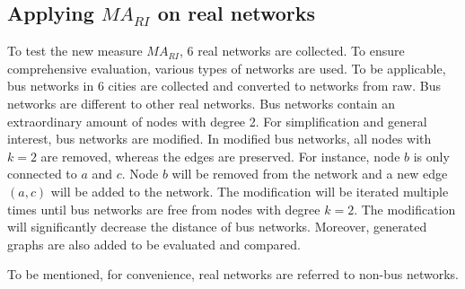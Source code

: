 \documentclass[12pt]{article}
\begin{document}
\subsection{Applying $MA_{RI}$ on real networks}
To test the new measure $MA_{RI}$, 6 real networks are collected. To ensure comprehensive evaluation, various types of networks are used. To be applicable, bus networks in 6 cities are collected and converted to networks from raw. Bus networks are different to other real networks. Bus networks contain an extraordinary amount of nodes with degree 2. For simplification and general interest, bus networks are modified. In modified bus networks, all nodes with $k=2$ are removed, whereas the edges are preserved. For instance, node $b$ is only connected to $a$ and $c$. Node $b$ will be removed from the network and a new edge $(a,c)$ will be added to the network. The modification will be iterated multiple times until bus networks are free from nodes with degree $k=2$. The modification will significantly decrease the distance of bus networks. Moreover, generated graphs are also added to be evaluated and compared.\par
To be mentioned, for convenience, real networks are referred to non-bus networks.
\end{document}
